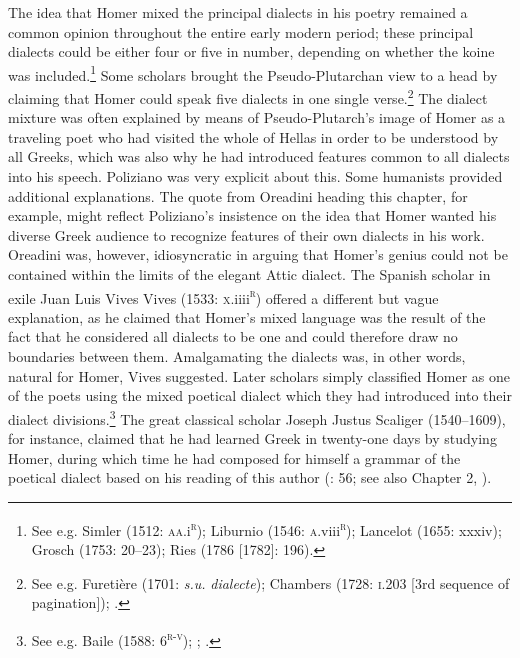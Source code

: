 \documentclass[output=paper]{langsci/langscibook}
\begin{document}
The idea that Homer mixed the principal dialects in his poetry remained a common opinion throughout the entire early modern period; these principal dialects could be either four or five in number, depending on whether the koine was included.\footnote{See e.g. Simler (1512: \textsc{aa.}i\textsc{\textsuperscript{r}}); Liburnio (1546: \textsc{a}.viii\textsc{\textsuperscript{r}}); Lancelot (1655: xxxiv); Grosch (1753: 20–23); Ries (1786 [1782]: 196).} Some scholars brought the Pseudo-Plutarchan view to a head by claiming that Homer could speak five dialects in one single verse.\footnote{See e.g. Furetière (1701: \textit{s.u.} \textit{dialecte}); Chambers (1728: \textsc{i.}203 [3rd sequence of pagination]); \citet[934]{Dumarsais1754}.} The dialect mixture was often explained by means of Pseudo-Plutarch’s image of Homer as a traveling poet who had visited the whole of Hellas in order to be understood by all Greeks, which was also why he had introduced features common to all dialects into his speech. Poliziano was very explicit about this. Some humanists provided additional explanations. The quote from Oreadini heading this chapter, for example, might reflect Poliziano’s insistence on the idea that Homer wanted his diverse Greek audience to recognize features of their own dialects in his work. Oreadini was, however, idiosyncratic in arguing that Homer’s genius could not be contained within the limits of the elegant Attic dialect. The Spanish scholar in exile Juan Luis Vives Vives (1533: \textsc{x}.iiii\textsc{\textsuperscript{r}}) offered a different but vague explanation, as he claimed that Homer’s mixed language was the result of the fact that he considered all dialects to be one and could therefore draw no boundaries between them. Amalgamating the dialects was, in other words, natural for Homer, Vives suggested. Later scholars simply classified Homer as one of the poets using the mixed poetical dialect which they had introduced into their dialect divisions.\footnote{See e.g. Baile (1588: 6\textsc{\textsuperscript{r-v}}); \citet[333]{Alsted1630}; \citet[161]{Gesner1774}.} The great classical scholar Joseph Justus Scaliger (1540–1609), for instance, claimed that he had learned Greek in twenty-one days by studying Homer, during which time he had composed for himself a grammar of the poetical dialect based on his reading of this author (\citealt{Scaliger1594}: 56; see also Chapter 2, ).
\end{document}
